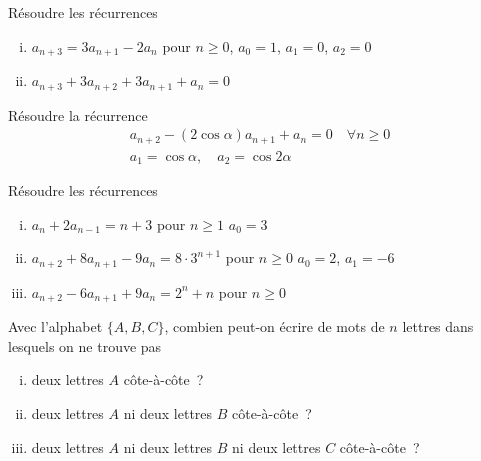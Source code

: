 
\begin{exo}
R\'esoudre les r\'ecurrences 
%
\begin{enumerate}[(i)]

\item $a_{n+3} = 3 a_{n+1} - 2 a_{n}$ pour $n \geqslant 0$,\hfill
      $a_0 = 1$, \quad $a_1 = 0$, \quad $a_2 = 0$
      
\item $a_{n+3} + 3 a_{n+2} + 3 a_{n+1} + a_n = 0$

\end{enumerate}
\end{exo}


\begin{exo}
R\'esoudre la r\'ecurrence
\[
\begin{array}{ll}
a_{n+2} - (2 \cos \alpha) a_{n+1} + a_n = 0\quad \forall n \geqslant 0\\
a_1 = \cos \alpha, \quad a_2 = \cos 2 \alpha
\end{array}
\]
\end{exo}


\begin{exo}
R\'esoudre les r\'ecurrences
%
\begin{enumerate}[(i)]
\item $a_n + 2 a_{n-1} = n+3$ pour $n \geqslant 1$\hfill
      $a_0 = 3$
      
\item $a_{n+2} + 8 a_{n+1} - 9 a_{n} = 8 \cdot 3^{n+1}$ pour $n \geqslant 0$\hfill
      $a_0 = 2$, \quad $a_1 = -6$
      
\item $a_{n+2} - 6 a_{n+1} + 9 a_{n} = 2^n + n$ pour $n \geqslant 0$

\end{enumerate}
\end{exo}


\begin{exo}
Avec l'alphabet $\{A,B,C\}$, combien peut-on \'ecrire de mots de $n$ lettres dans lesquels on ne trouve pas
%
\begin{enumerate}[(i)]
\item deux lettres $A$ c\^ote-\`a-c\^ote~?
\item deux lettres $A$ ni deux lettres $B$ c\^ote-\`a-c\^ote~?
\item deux lettres $A$ ni deux lettres $B$ ni deux lettres $C$ c\^ote-\`a-c\^ote~?
\end{enumerate}
\end{exo}

